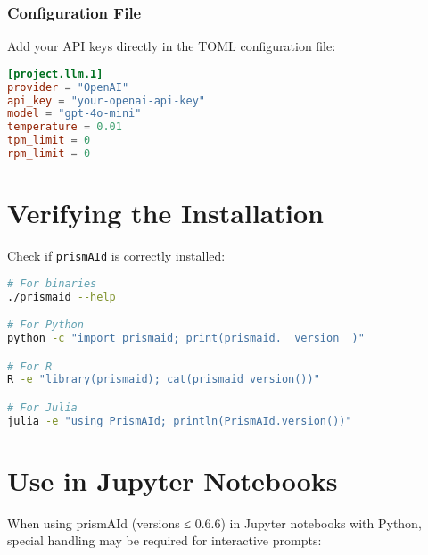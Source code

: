 \subsubsection{Configuration File}

Add your API keys directly in the TOML configuration file:

\begin{configbox}
\begin{lstlisting}[language=TOML]
[project.llm.1]
provider = "OpenAI"
api_key = "your-openai-api-key"
model = "gpt-4o-mini"
temperature = 0.01
tpm_limit = 0
rpm_limit = 0
\end{lstlisting}
\end{configbox}


\section{Verifying the Installation}

Check if \texttt{prismAId} is correctly installed:

\begin{commandbox}
\begin{lstlisting}[language=Bash]
# For binaries
./prismaid --help

# For Python
python -c "import prismaid; print(prismaid.__version__)"

# For R
R -e "library(prismaid); cat(prismaid_version())"

# For Julia
julia -e "using PrismAId; println(PrismAId.version())"
\end{lstlisting}
\end{commandbox}

\section{Use in Jupyter Notebooks}

When using prismAId (versions ≤ 0.6.6) in Jupyter notebooks with Python, special handling may be required for interactive prompts:

